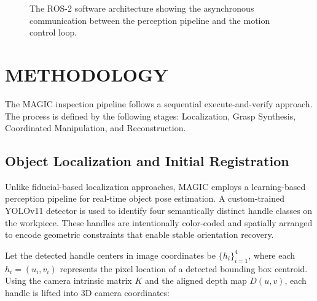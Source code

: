 \documentclass[letterpaper, 10 pt, conference]{ieeeconf}  %
\begin{document}
\begin{figure}[thpb]
   \centering
   \framebox{\parbox{3in}{}}
   \caption{The ROS-2 software architecture showing the asynchronous communication between the perception pipeline and the motion control loop.}
   \label{fig:architecture}
\end{figure}

\section{METHODOLOGY}

The MAGIC inspection pipeline follows a sequential execute-and-verify approach. The process is defined by the following stages: Localization, Grasp Synthesis, Coordinated Manipulation, and Reconstruction.

\subsection{Object Localization and Initial Registration}

Unlike fiducial-based localization approaches, MAGIC employs a
learning-based perception pipeline for real-time object pose estimation.
A custom-trained YOLOv11 detector is used to identify four
semantically distinct handle classes on the workpiece. These handles
are intentionally color-coded and spatially arranged to encode geometric
constraints that enable stable orientation recovery.

Let the detected handle centers in image coordinates be
$\{h_i\}_{i=1}^4$, where each $h_i = (u_i, v_i)$ represents the pixel
location of a detected bounding box centroid. Using the camera intrinsic
matrix $K$ and the aligned depth map $D(u,v)$, each handle is lifted
into 3D camera coordinates:
\end{document}
